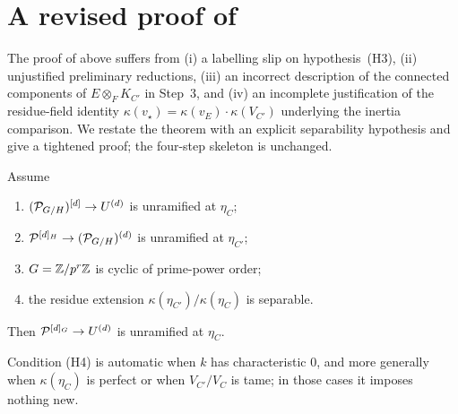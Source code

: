 \documentclass[11pt]{article}
\begin{document}
\section{A revised proof of \texorpdfstring{}{the unramifiedness theorem}}\label{sec:main-revised}

The proof of  above suffers from (i) a labelling slip on
hypothesis~(H3), (ii) unjustified preliminary reductions, (iii) an incorrect
description of the connected components of $E \otimes_F K_{C'}$ in Step~3,
and (iv) an incomplete justification of the residue-field identity
$\kappa(v_\star) = \kappa(v_E) \cdot \kappa(V_{C'})$ underlying the inertia
comparison.  We restate the theorem with an explicit separability hypothesis
and give a tightened proof; the four-step skeleton is unchanged.

\begin{theorem}\label{thm:main-revised}
Assume
\begin{enumerate}
  \item[\textnormal{(H1)}] $(\mathcal{P}_{G/H})^{[d]} \to U^{(d)}$ is unramified at
        $\eta_C$;
  \item[\textnormal{(H2)}] $\mathcal{P}^{[d]_H} \to (\mathcal{P}_{G/H})^{(d)}$ is unramified at
        $\eta_{C'}$;
  \item[\textnormal{(H3)}] $G = \mathbb{Z}/p^r\mathbb{Z}$ is cyclic of prime-power order;
  \item[\textnormal{(H4)}] the residue extension
        $\kappa(\eta_{C'})/\kappa(\eta_C)$ is separable.
\end{enumerate}
Then $\mathcal{P}^{[d]_G} \to U^{(d)}$ is unramified at $\eta_C$.
\end{theorem}

Condition (H4) is automatic when $k$ has characteristic $0$, and more
generally when $\kappa(\eta_C)$ is perfect or when $V_{C'}/V_C$ is tame; in
those cases it imposes nothing new.
\end{document}
